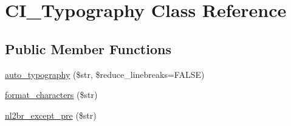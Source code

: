\hypertarget{class_c_i___typography}{}\section{C\+I\+\_\+\+Typography Class Reference}
\label{class_c_i___typography}
\subsection*{Public Member Functions}
\begin{DoxyCompactItemize}
\item 
\mbox{\hyperlink{class_c_i___typography_a26ee2b1a53890470e05e49df7f698d33}{auto\+\_\+typography}} (\$str, \$reduce\+\_\+linebreaks=F\+A\+L\+SE)
\item 
\mbox{\hyperlink{class_c_i___typography_adda8d4b7710214f638ed761a6e035fbc}{format\+\_\+characters}} (\$str)
\item 
\mbox{\hyperlink{class_c_i___typography_a6c9560b1e1b7d2e290cb29c8df935f06}{nl2br\+\_\+except\+\_\+pre}} (\$str)
\end{DoxyCompactItemize}

